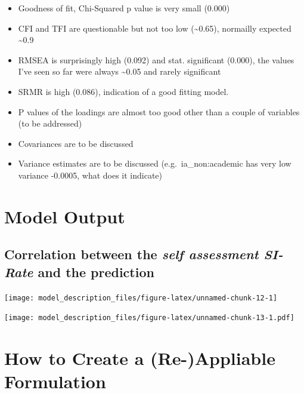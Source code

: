 \documentclass[
]{article}
\providecommand{\tightlist}{%
  \setlength{\itemsep}{0pt}\setlength{\parskip}{0pt}}
\begin{document}
\begin{itemize}
\tightlist
\item
  Goodness of fit, Chi-Squared p value is very small (0.000)
\item
  CFI and TFI are questionable but not too low (\textasciitilde0.65),
  normailly expected \textasciitilde0.9
\item
  RMSEA is surprisingly high (0.092) and stat. significant (0.000), the
  values I've seen so far were always \textasciitilde0.05 and rarely
  significant
\item
  SRMR is high (0.086), indication of a good fitting model.
\item
  P values of the loadings are almost too good other than a couple of
  variables (to be addressed)
\item
  Covariances are to be discussed
\item
  Variance estimates are to be discussed (e.g.~ia\_non:academic has very
  low variance -0.0005, what does it indicate)
\end{itemize}

\hypertarget{model-output}{%
\section{Model Output}\label{model-output}}

\hypertarget{correlation-between-the-self-assessment-si-rate-and-the-prediction}{%
\subsection{\texorpdfstring{Correlation between the \emph{self
assessment SI-Rate} and the
prediction}{Correlation between the self assessment SI-Rate and the prediction}}\label{correlation-between-the-self-assessment-si-rate-and-the-prediction}}

\begin{center}\texttt{[image: model\_description\_files/figure-latex/unnamed-chunk-12-1]} \end{center}

\texttt{[image: model\_description\_files/figure-latex/unnamed-chunk-13-1.pdf]}

\hypertarget{how-to-create-a-re-appliable-formulation}{%
\section{How to Create a (Re-)Appliable
Formulation}\label{how-to-create-a-re-appliable-formulation}}
\end{document}
